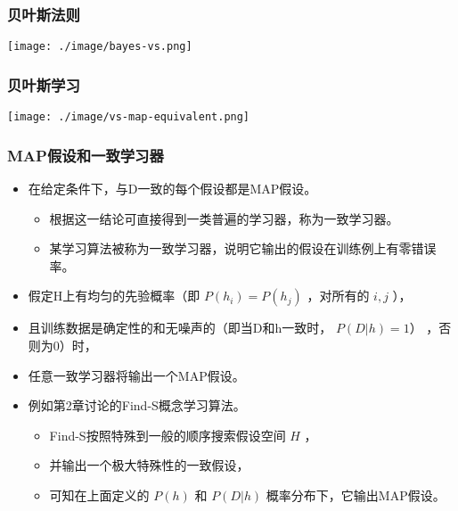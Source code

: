 \documentclass{beamer}
\begin{document}
\begin{frame}
\frametitle{贝叶斯法则}
\label{sec-2-4}

\texttt{[image: ./image/bayes-vs.png]}
\end{frame}
\begin{frame}
\frametitle{贝叶斯学习}
\label{sec-2-5}


\texttt{[image: ./image/vs-map-equivalent.png]}
\end{frame}
\begin{frame}
\frametitle{MAP假设和一致学习器}
\label{sec-2-6}

\begin{itemize}
\item 在给定条件下，与D一致的每个假设都是MAP假设。
\begin{itemize}
\item 根据这一结论可直接得到一类普遍的学习器，称为一致学习器。
\item 某学习算法被称为一致学习器，说明它输出的假设在训练例上有零错误率。
\end{itemize}
\item 假定H上有均匀的先验概率（即 $P(h_i)=P(h_j)$ ，对所有的 $i,j$ ），
\item 且训练数据是确定性的和无噪声的（即当D和h一致时， $P(D|h)=1）$ ，否则为0）时，
\item 任意一致学习器将输出一个MAP假设。
\item 例如第2章讨论的Find-S概念学习算法。
\begin{itemize}
\item Find-S按照特殊到一般的顺序搜索假设空间 $H$ ，
\item 并输出一个极大特殊性的一致假设，
\item 可知在上面定义的 $P(h)$ 和 $P(D|h)$ 概率分布下，它输出MAP假设。
\end{itemize}
\end{itemize}
\end{frame}
\end{document}

